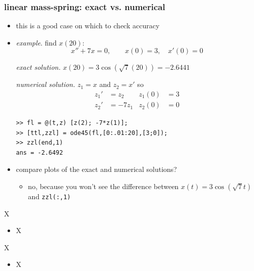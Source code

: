 \documentclass[urlcolor=blue,dvipsnames]{beamer}
\begin{document}
\begin{frame}[fragile]
\frametitle{linear mass-spring: exact vs. numerical}

\begin{itemize}
\item this is a good case on which to check accuracy
\item \emph{example}.  find $x(20)$:
    $$x''+ 7 x = 0, \qquad x(0)=3, \quad x'(0)=0$$

\medskip
\noindent \emph{exact solution.}  $x(20)=3 \cos(\sqrt{7}(20)) = -2.6441$

\bigskip
\noindent \emph{numerical solution.}  $z_1=x$ and $z_2=x'$ so
\begin{align*}
z_1' &= z_2 & z_1(0)&=3 \\
z_2' &= - 7 z_1 & z_2(0)&=0
\end{align*}

\begin{Verbatim}[fontsize=\footnotesize]
>> fl = @(t,z) [z(2); -7*z(1)];
>> [ttl,zzl] = ode45(fl,[0:.01:20],[3;0]);
>> zzl(end,1)
ans = -2.6492
\end{Verbatim}

\item compare plots of the exact and numerical solutions?
    \begin{itemize}
    \item no, because you won't see the difference between $x(t)=3 \cos(\sqrt{7} t)$ and \texttt{zzl(:,1)}
    \end{itemize}
\end{itemize}
\end{frame}


\begin{frame}{X}

\begin{itemize}
\item X
\end{itemize}
\end{frame}


\begin{frame}{X}

\begin{itemize}
\item X
\end{itemize}
\end{frame}
\end{document}
